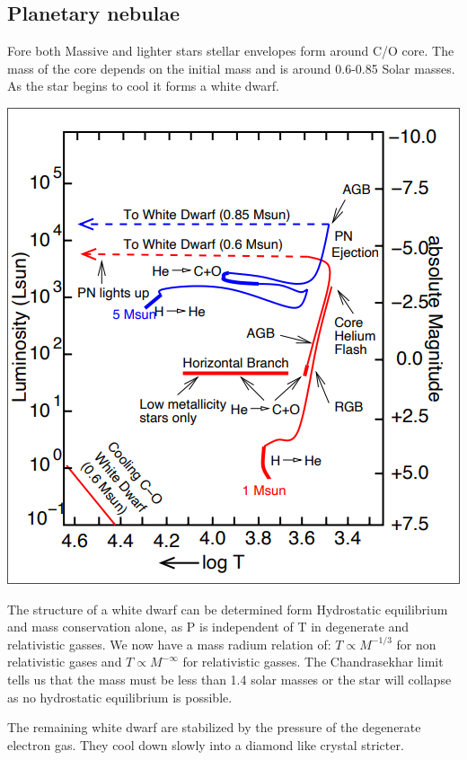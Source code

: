 \documentclass[11pt,a4paper]{article}
\begin{document}
\subsection{Planetary nebulae}
Fore both Massive and lighter stars stellar envelopes form around C/O core. 
The mass of the core depends on the initial mass and is around 0.6-0.85 Solar masses.
As the star begins to cool it forms a white dwarf. 
\begin{center}
    \includegraphics[width=0.5\linewidth]{screenshot_2024-01-23-125950.png}
\end{center}
The structure of a white dwarf can be determined form Hydrostatic equilibrium and mass conservation alone, as P is independent of T in degenerate and relativistic gasses. 
We now have a mass radium relation of: $T \propto M^{-1/3} $ for non relativistic gases and $T \propto M^{-\infty} $ for relativistic gasses.
The Chandrasekhar limit tells us that the mass must be less than 1.4 solar masses or the star will collapse as no hydrostatic equilibrium is possible.

The remaining white dwarf are stabilized by the pressure of the degenerate electron gas. 
They cool down slowly into a diamond like crystal stricter.
\end{document}

